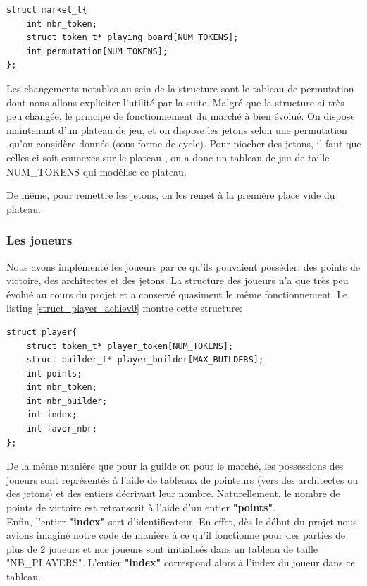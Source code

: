 \documentclass{article}
\begin{document}
        \begin{lstlisting}[frame=single, caption={Modification de la structure de notre marché pour l'achievement 1},label={struct_market_achiev1}]
struct market_t{
    int nbr_token;
    struct token_t* playing_board[NUM_TOKENS];
    int permutation[NUM_TOKENS];
};

    \end{lstlisting}
      



        Les changements notables au sein de la structure sont le tableau de permutation dont nous allons expliciter l'utilité par la suite. Malgré que la structure ai très peu changée, le principe de fonctionnement du marché à bien évolué. On dispose maintenant d'un plateau de jeu, et on dispose les jetons selon une permutation ,qu'on considère donnée (sous forme de cycle). Pour piocher des jetons, il faut que celles-ci soit connexes sur le plateau , on a donc un tableau de jeu de taille NUM\_TOKENS qui modélise ce plateau.

            De même, pour remettre les jetons, on les remet à la première place vide du plateau.
        
        
        
        \subsubsection{Les joueurs} %

        Nous avons implémenté les joueurs par ce qu'ils pouvaient posséder: des points de victoire, des architectes et des jetons.
        La structure des joueurs n'a que très peu évolué au cours du projet et a conservé quasiment le même fonctionnement. Le listing  \ref{struct_player_achiev0} montre cette structure:

        \vspace{1em}

 \begin{lstlisting}[frame=single, caption={Structure d'un joueur},label={struct_player_achiev0}]
struct player{
    struct token_t* player_token[NUM_TOKENS];
    struct builder_t* player_builder[MAX_BUILDERS];
    int points;
    int nbr_token;
    int nbr_builder;
    int index;
    int favor_nbr;
};

    \end{lstlisting}
    \vspace{1em}      

        De la même manière que pour la guilde ou pour le marché, les possessions des joueurs sont représentés à l'aide de tableaux de pointeurs (vers des architectes ou des jetons) et des entiers décrivant leur nombre. Naturellement, le nombre de points de victoire est retranscrit à l'aide d'un entier \textbf{"points"}.\\
        Enfin, l'entier \textbf{"index"} sert d'identificateur. En effet, dès le début du projet nous avions imaginé notre code de manière à ce qu'il fonctionne pour des parties de plus de 2 joueurs et nos joueurs sont initialisés dans un tableau de taille "NB\_PLAYERS". L'entier \textbf{"index"} correspond alors à l'index du joueur dans ce tableau.
\end{document}
